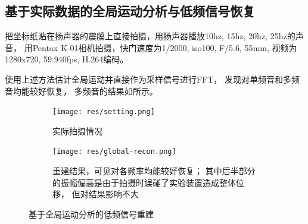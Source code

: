 
\subsection{基于实际数据的全局运动分析与低频信号恢复\label{sec:data-global}}

把坐标纸贴在扬声器的震膜上直接拍摄，用扬声器播放10hz, 15hz, 20hz, 25hz的声音，
用Pentax K-01相机拍摄，快门速度为1/2000, iso100, F/5.6, 55mm, 视频为1280x720,
59.940fps, H.264编码。

使用上述方法估计全局运动并直接作为采样信号进行FFT，
发现对单频音和多频音均能较好恢复，
多频音的结果如所示。
\begin{figure}[h!]\begin{center}
    \begin{subfigure}[b]{.5\figwidth}
        \texttt{[image: res/setting.png]}
        \caption{实际拍摄情况}
    \end{subfigure}
    \begin{subfigure}[b]{.5\figwidth}
        \texttt{[image: res/global-recon.png]}
        \caption{重建结果，可见对各频率均能较好恢复；
            其中后半部分的振幅偏高是由于拍摄时误碰了实验装置造成整体位移，
            但对结果影响不大}
    \end{subfigure}
    \caption{基于全局运动分析的低频信号重建}
    \label{fig:real:lowfreq}
\end{center}\end{figure}


